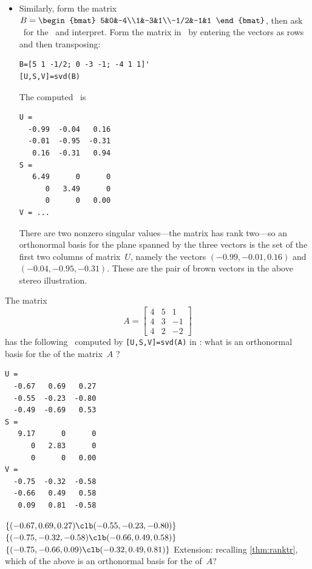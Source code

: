 \begin{example}
\begin{solution}
\begin{itemize}
\item Similarly, form the matrix 
\(B=\begin{bmat} 5&0&-4\\1&-3&1\\-1/2&-1&1 \end{bmat}\),
then ask \script\ for the \svd\ and interpret.
Form the matrix in \script\ by entering the vectors as rows and then transposing:
\begin{verbatim}
B=[5 1 -1/2; 0 -3 -1; -4 1 1]'
[U,S,V]=svd(B)
\end{verbatim}
\setbox\ajrqrbox\hbox{}%
\marginajrbox%
The computed \svd\ is \twodp
\begin{verbatim}
U =
  -0.99  -0.04   0.16
  -0.01  -0.95  -0.31
   0.16  -0.31   0.94
S =
   6.49      0      0
      0   3.49      0
      0      0   0.00
V = ...
\end{verbatim}
There are two nonzero singular values---the matrix has rank two---so an orthonormal basis for the plane spanned by the three vectors is the set of the first two columns of matrix~\(U\), namely the vectors  \((-0.99,-0.01,0.16)\) and \((-0.04,-0.95,-0.31)\).
These are the pair of brown vectors in the above stereo illustration.
\aqed
\end{itemize} 
\end{solution}
\end{example}




\begin{activity}
The matrix
\begin{equation*}
A=\begin{bmatrix} 4&5&1
\\4&3&-1
\\4&2&-2 \end{bmatrix}
\end{equation*}
has the following \svd\ computed by \verb|[U,S,V]=svd(A)| in \script: what is an orthonormal basis for the  of the matrix~\(A\) \twodp?
\begin{verbatim}
U =
  -0.67   0.69   0.27
  -0.55  -0.23  -0.80
  -0.49  -0.69   0.53
S =
   9.17      0      0
      0   2.83      0
      0      0   0.00
V =
  -0.75  -0.32  -0.58
  -0.66   0.49   0.58
   0.09   0.81  -0.58
\end{verbatim}
{\(\{(-0.67,0.69,0.27)\clb (-0.55,-0.23,-0.80)\}\)}
{\(\{(-0.75,-0.32,-0.58)\clb (-0.66,0.49,0.58)\}\)}
{\(\{(-0.75,-0.66,0.09)\clb (-0.32,0.49,0.81)\}\)}
Extension: recalling \cref{thm:ranktr}, which of the above is an orthonormal basis for the  of~\(A\)?
\end{activity}




